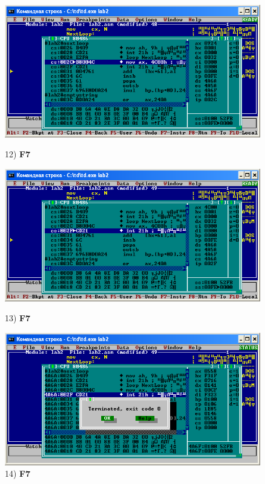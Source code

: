 \begin{figure}[!htp]
    \centering
    \begin{minipage}{0.32\textwidth}
        \centering
        \includegraphics[width=.99\linewidth]
            {../_INCLUDES/task-4-9/12.png}
        \caption{12) \textbf{F7}}
        \label{fig:task_4_9}
    \end{minipage}
    \begin {minipage}{0.32\textwidth}
        \centering
        \includegraphics[width=.99\linewidth]
            {../_INCLUDES/task-4-9/13.png}
        \caption{13) \textbf{F7}}
        \label{fig:task_4_9}
    \end{minipage}
    \begin {minipage}{0.32\textwidth}
        \centering
        \includegraphics[width=.99\linewidth]
            {../_INCLUDES/task-4-9/14.png}
        \caption{14) \textbf{F7}}
        \label{fig:task_4_9}
    \end{minipage}
\end{figure}

